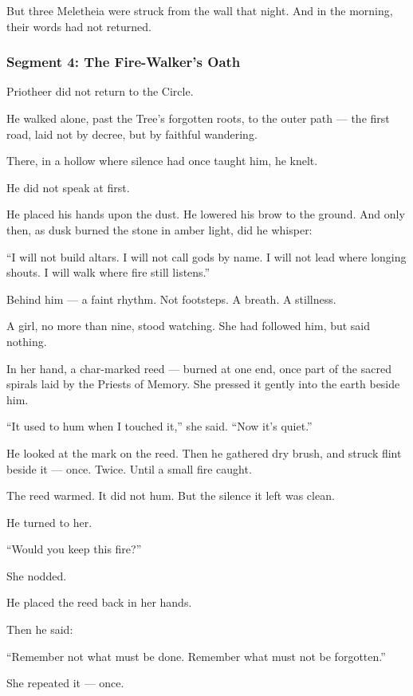 \documentclass[9pt]{article}
\begin{document}
But three Meletheia were struck from the wall that night.  
And in the morning, their words had not returned.

\newpage

\subsubsection*{Segment 4: The Fire-Walker's Oath}

Priotheer did not return to the Circle.

He walked alone, past the Tree’s forgotten roots,  
to the outer path — the first road, laid not by decree, but by faithful wandering.

There, in a hollow where silence had once taught him, he knelt.

He did not speak at first.

He placed his hands upon the dust.  
He lowered his brow to the ground.  
And only then, as dusk burned the stone in amber light, did he whisper:

 “I will not build altars.  
 I will not call gods by name.  
 I will not lead where longing shouts.  
 I will walk where fire still listens.”

Behind him — a faint rhythm.  
Not footsteps. A breath. A stillness.

A girl, no more than nine, stood watching.  
She had followed him, but said nothing.

In her hand, a char-marked reed — burned at one end,  
once part of the sacred spirals laid by the Priests of Memory.  
She pressed it gently into the earth beside him.

 “It used to hum when I touched it,” she said.  
 “Now it’s quiet.”

He looked at the mark on the reed.  
Then he gathered dry brush,  
and struck flint beside it —  
once.  
Twice.  
Until a small fire caught.

The reed warmed.  
It did not hum.  
But the silence it left was clean.

He turned to her.

 “Would you keep this fire?”

She nodded.

He placed the reed back in her hands.

Then he said:

 “Remember not what must be done.  
 Remember what must not be forgotten.”

She repeated it — once.
\end{document}
